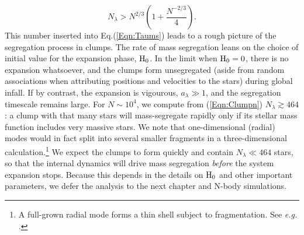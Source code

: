 \begin{equation} \label{Eqn:Clumpn} 
   N_\lambda > N^{2/3}\left( 1 + \frac{N^{-2/3}}{4} \right) .
\end{equation}
This number inserted into Eq.(\ref{Eqn:Taums}) leads to a rough picture of the segregation process in clumps. The rate of mass segregation leans  on the choice of initial value for the expansion phase, ${\textrm{H}}_0$. In the limit when ${\textrm{H}}_0 = 0$, there is no expansion whatsoever, and the clumps form unsegregated (aside from random associations when attributing positions and velocities to the stars) during global infall. If by contrast, the expansion is vigourous, $a_\lambda \gg 1$, and the segregation timescale remains large. For $N \sim 10^4$, we compute from (\ref{Eqn:Clumpn}) $N_\lambda \gtrsim 464$: a clump with that many stars will mass-segregate rapidly only if its stellar mass function includes very massive stars. We note that one-dimensional (radial) modes would in fact split into several smaller fragments in a three-dimensional calculation.\footnote{ A full-grown radial mode forms a thin shell subject to fragmentation. See \textit{e.g.}  \cite{Ehlerova1997,Wunsch2010}.} We expect  the clumps to form quickly  and contain $N_\lambda \ll 464$ stars, so  that the internal dynamics 
will drive mass segregation {\it before} the system expansion stops. Because this depends in the details on ${\textrm{H}}_0$ and other important parameters, 
we defer the analysis to the next chapter and N-body simulations. 



